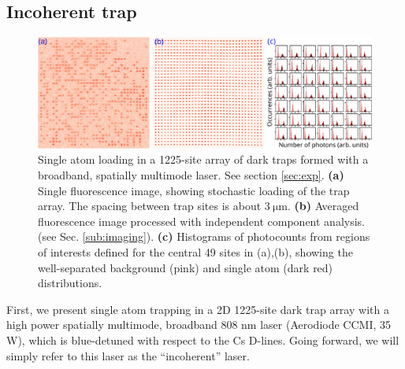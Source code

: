\subsection{Incoherent trap}\label{sub:incoherent}
\begin{figure}[!t]
    \centering
    \includegraphics[width=\textwidth]{Images/figure4.eps}
    \caption{Single atom loading in a 1225-site array of dark traps formed with a broadband, spatially multimode laser. See section \ref{sec:exp}. \textbf{(a)} Single fluorescence image, showing stochastic loading of the trap array. The spacing between trap sites is about $3~\mathrm{ \mu m}$. \textbf{(b)} Averaged fluorescence image processed with independent component analysis. (see Sec. \ref{sub:imaging}). \textbf{(c)} Histograms of photocounts from regions of interests defined for the central 49 sites in (a),(b), showing the well-separated background (pink) and single atom (dark red) distributions.}
    \label{fig:bigarray}
\end{figure}
First, we present single atom trapping in a 2D 1225-site  dark trap array with a high power spatially multimode, broadband 808 nm laser (Aerodiode CCMI, 35 W), which is blue-detuned with respect to  the Cs D-lines. Going forward, we will simply refer to this laser as the ``incoherent'' laser. 

